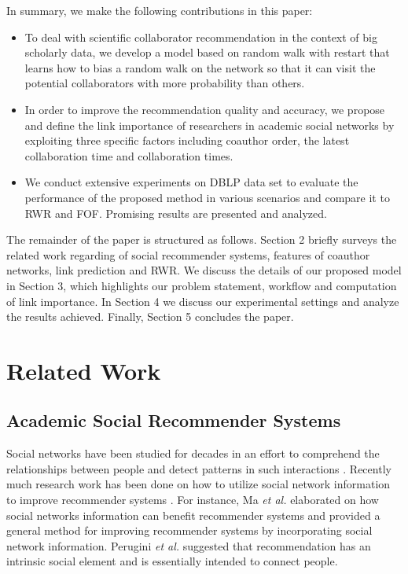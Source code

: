 \documentclass[10pt,journal,compsoc]{IEEEtran}
\begin{document}
In summary, we make the following contributions in this paper:
\begin{itemize}
\item To deal with scientific collaborator recommendation in the context of big scholarly data, we develop a model based on random walk with restart that learns how to bias a random walk on the network so that it can visit the potential collaborators with more probability than others.
\item In order to improve the recommendation quality and accuracy, we propose and define the link importance of researchers in academic social networks by exploiting three specific factors including coauthor order, the latest collaboration time and collaboration times.
\item We conduct extensive experiments on DBLP data set to evaluate the performance of the proposed method in various scenarios and compare it to RWR and FOF. Promising results are presented and analyzed.
\end{itemize}

The remainder of the paper is structured as follows. Section 2 briefly surveys the related work regarding of social recommender systems, features of coauthor networks, link prediction and RWR. We discuss the details of our proposed model in Section 3, which highlights our problem statement, workflow and computation of link importance. In Section 4 we discuss our experimental settings and analyze the results achieved. Finally, Section 5 concludes the paper.


\section{Related Work}

\subsection{Academic Social Recommender Systems}
Social networks have been studied for decades in an effort to comprehend the relationships between people and detect patterns in such interactions \cite{Barabasi:linked}. Recently much research work has been done on how to utilize social network information to improve recommender systems \cite{Freyne:Social, He:SNRS}. For instance, Ma \textit{et al.} \cite{Ma:Recommender} elaborated on how social networks information can benefit recommender systems and provided a general method for improving recommender systems by incorporating social network information. Perugini \textit{et al.} \cite{Perugini:Recommender} suggested that recommendation has an intrinsic social element and is essentially intended to connect people.
\end{document}
